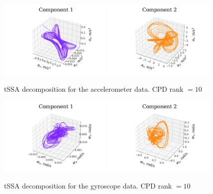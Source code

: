 \documentclass[referee, pdflatex, sn-mathphys-num]{sn-jnl}
\theoremstyle{definition}
\theoremstyle{plain}
\begin{document}
	\begin{figure}[h]
		\centering
		\includegraphics[width=0.48\textwidth, 	keepaspectratio]{acceler_1.png}
		\includegraphics[width=0.48\textwidth, keepaspectratio]{acceler_2.png}
		\caption{tSSA decomposition for the accelerometer data. CPD rank $ = 10 $}\label{fig:accel_decomp_tssa}
	\end{figure}
	
	\begin{figure}[h]
		\centering
		\includegraphics[width=0.48\textwidth, 	keepaspectratio]{gyro_1.png}
		\includegraphics[width=0.48\textwidth, keepaspectratio]{gyro_2.png}
		\caption{tSSA decomposition for the gyroscope data. CPD rank $ = 10 $}\label{fig:gyro_decomp_tssa}
	\end{figure}
	
\end{document}
